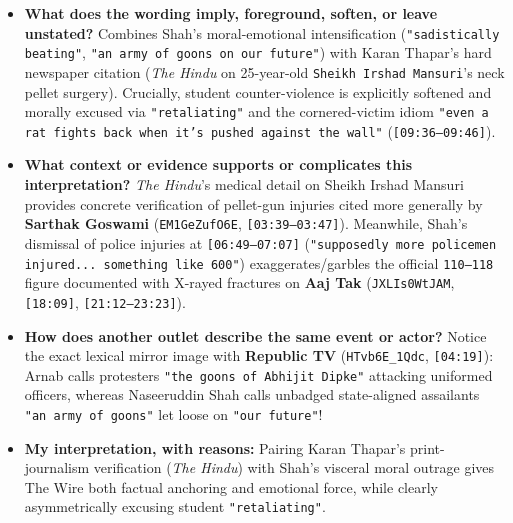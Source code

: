\documentclass[10pt,a4paper]{article}
\begin{document}
\begin{itemize}[leftmargin=1.5em, itemsep=3pt, topsep=4pt]
  \item \textbf{What does the wording imply, foreground, soften, or leave unstated?} Combines Shah's moral-emotional intensification (\texttt{"sadistically beating"}, \texttt{"an army of goons on our future"}) with Karan Thapar's hard newspaper citation (\textit{The Hindu} on 25-year-old \texttt{Sheikh Irshad Mansuri}'s neck pellet surgery). Crucially, student counter-violence is explicitly softened and morally excused via \texttt{"retaliating"} and the cornered-victim idiom \texttt{"even a rat fights back when it's pushed against the wall"} (\texttt{[09:36--09:46]}).
  \item \textbf{What context or evidence supports or complicates this interpretation?} \textit{The Hindu}'s medical detail on Sheikh Irshad Mansuri provides concrete verification of pellet-gun injuries cited more generally by \textbf{Sarthak Goswami} (\texttt{EM1GeZufO6E}, \texttt{[03:39--03:47]}). Meanwhile, Shah's dismissal of police injuries at \texttt{[06:49--07:07]} (\texttt{"supposedly more policemen injured... something like 600"}) exaggerates/garbles the official \texttt{110--118} figure documented with X-rayed fractures on \textbf{Aaj Tak} (\texttt{JXLIs0WtJAM}, \texttt{[18:09]}, \texttt{[21:12--23:23]}).
  \item \textbf{How does another outlet describe the same event or actor?} Notice the exact lexical mirror image with \textbf{Republic TV} (\texttt{HTvb6E\_1Qdc}, \texttt{[04:19]}): Arnab calls protesters \texttt{"the goons of Abhijit Dipke"} attacking uniformed officers, whereas Naseeruddin Shah calls unbadged state-aligned assailants \texttt{"an army of goons"} let loose on \texttt{"our future"}!
  \item \textbf{My interpretation, with reasons:} Pairing Karan Thapar's print-journalism verification (\textit{The Hindu}) with Shah's visceral moral outrage gives The Wire both factual anchoring and emotional force, while clearly asymmetrically excusing student \texttt{"retaliating"}.
\end{itemize}
\end{document}
